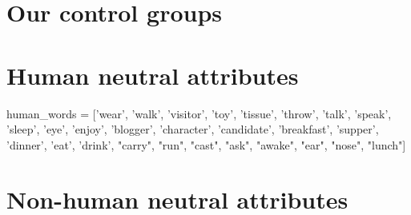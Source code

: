 \documentclass[12pt,]{book}
\newenvironment{Shaded}{\begin{snugshade}}{\end{snugshade}}
\newcommand{\StringTok}[1]{\textcolor[rgb]{0.31,0.60,0.02}{#1}}
\newcommand{\NormalTok}[1]{#1}
\begin{document}
\normalsize

\section*{Our control groups}\label{our-control-groups}

\section*{Human neutral attributes}\label{human-neutral-attributes}

\vspace{1mm} \scriptsize

\begin{Shaded}
\begin{Highlighting}[]
\NormalTok{human_words =}\StringTok{ }\NormalTok{[}\StringTok{'wear'}\NormalTok{, }\StringTok{'walk'}\NormalTok{, }\StringTok{'visitor'}\NormalTok{, }\StringTok{'toy'}\NormalTok{, }\StringTok{'tissue'}\NormalTok{, }\StringTok{'throw'}\NormalTok{, }\StringTok{'talk'}\NormalTok{, }
               \StringTok{'speak'}\NormalTok{, }\StringTok{'sleep'}\NormalTok{, }\StringTok{'eye'}\NormalTok{, }\StringTok{'enjoy'}\NormalTok{, }\StringTok{'blogger'}\NormalTok{, }\StringTok{'character'}\NormalTok{, }
               \StringTok{'candidate'}\NormalTok{, }\StringTok{'breakfast'}\NormalTok{, }\StringTok{'supper'}\NormalTok{, }\StringTok{'dinner'}\NormalTok{, }\StringTok{'eat'}\NormalTok{, }\StringTok{'drink'}\NormalTok{,}
               \StringTok{"carry"}\NormalTok{, }\StringTok{"run"}\NormalTok{, }\StringTok{"cast"}\NormalTok{, }\StringTok{"ask"}\NormalTok{, }\StringTok{"awake"}\NormalTok{, }\StringTok{"ear"}\NormalTok{, }\StringTok{"nose"}\NormalTok{, }\StringTok{"lunch"}\NormalTok{]}
\end{Highlighting}
\end{Shaded}

\normalsize

\section*{Non-human neutral
attributes}\label{non-human-neutral-attributes}

\vspace{1mm} \footnotesize

\normalsize
\end{document}
